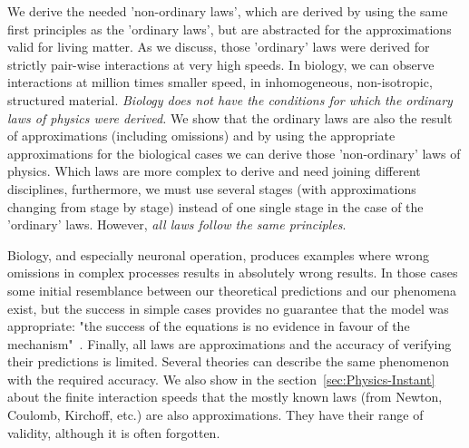 We derive the needed 'non-ordinary laws', which are derived by using the same first principles as the 'ordinary laws', but are abstracted for the
approximations valid for living matter.
As we discuss, those 'ordinary' laws were derived for strictly pair-wise interactions at very high speeds.
In biology, we can observe interactions at million times smaller speed, in inhomogeneous, non-isotropic, structured material.
\textit{Biology does not have the conditions for which the ordinary laws of physics were derived.}
We show that the ordinary laws are also the result of approximations
(including omissions) and by using the appropriate approximations for the 
biological cases we can derive those 'non-ordinary' laws of physics.
Which laws are more complex to derive and need joining
different disciplines, furthermore, we must use several
stages (with approximations changing from stage by stage) instead of 
one single stage in the case of the 'ordinary' laws. 
However, \textit{all laws follow the same principles}.


Biology, and especially neuronal operation, produces examples where wrong omissions
in complex processes results in absolutely wrong results. In those cases
some initial resemblance between our theoretical predictions and our phenomena exist, but the success
in simple cases provides no guarantee that the model was appropriate: "the success of the equations is no evidence in
favour of the mechanism"~\cite{HodgkinHuxley:1952}.
Finally,
all laws are approximations and the accuracy of verifying their predictions is limited.
Several theories can describe the same phenomenon with the required accuracy.
We also show in the section~\ref{sec:Physics-Instant} about the 
{finite interaction speeds}
 that the mostly known laws (from Newton, Coulomb, Kirchoff, etc.) are
also approximations. They have their range of validity, although it is often
forgotten.

